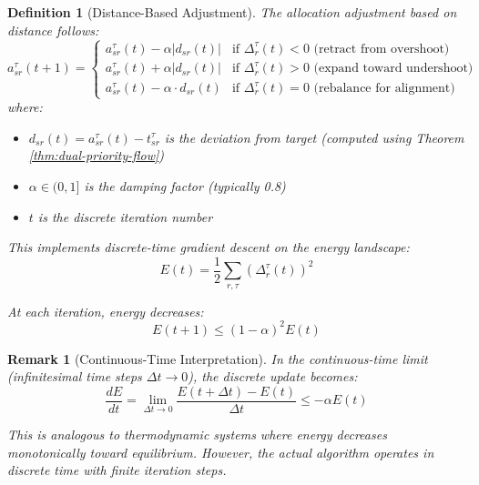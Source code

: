 \documentclass[11pt]{article}
\newtheorem{definition}{Definition}
\newtheorem{remark}{Remark}
\begin{document}
\begin{definition}[Distance-Based Adjustment]
The allocation adjustment based on distance follows:
\[
a_{sr}^{\tau}(t+1) = \begin{cases}
a_{sr}^{\tau}(t) - \alpha |d_{sr}(t)| & \text{if } \Delta_r^\tau(t) < 0 \text{ (retract from overshoot)} \\
a_{sr}^{\tau}(t) + \alpha |d_{sr}(t)| & \text{if } \Delta_r^\tau(t) > 0 \text{ (expand toward undershoot)} \\
a_{sr}^{\tau}(t) - \alpha \cdot d_{sr}(t) & \text{if } \Delta_r^\tau(t) = 0 \text{ (rebalance for alignment)}
\end{cases}
\]
where:
\begin{itemize}
\item $d_{sr}(t) = a_{sr}^\tau(t) - t_{sr}^\tau$ is the deviation from target (computed using Theorem \ref{thm:dual-priority-flow})
\item $\alpha \in (0,1]$ is the damping factor (typically 0.8)
\item $t$ is the discrete iteration number
\end{itemize}

This implements discrete-time gradient descent on the energy landscape:
\[
E(t) = \frac{1}{2} \sum_{r,\tau} (\Delta_r^\tau(t))^2
\]

At each iteration, energy decreases:
\[
E(t+1) \leq (1-\alpha)^2 E(t)
\]
\end{definition}

\begin{remark}[Continuous-Time Interpretation]
In the continuous-time limit (infinitesimal time steps $\Delta t \to 0$), the discrete update becomes:
\[
\frac{dE}{dt} = \lim_{\Delta t \to 0} \frac{E(t + \Delta t) - E(t)}{\Delta t} \leq -\alpha E(t)
\]

This is analogous to thermodynamic systems where energy decreases monotonically toward equilibrium. However, the actual algorithm operates in discrete time with finite iteration steps.
\end{remark}
\end{document}
